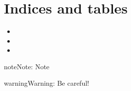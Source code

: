 \documentclass[letterpaper,10pt,english]{sphinxmanual}
\begin{document}
\chapter{Indices and tables}
\label{\detokenize{index:indices-and-tables}}\begin{itemize}
\item {} 

\item {} 

\item {} 

\end{itemize}

\begin{sphinxadmonition}{note}{Note:}
Note 
\end{sphinxadmonition}

\begin{sphinxadmonition}{warning}{Warning:}
Be careful!
\end{sphinxadmonition}



\renewcommand{\indexname}{Index}
\footnotesize\raggedright\printindex
\end{document}
